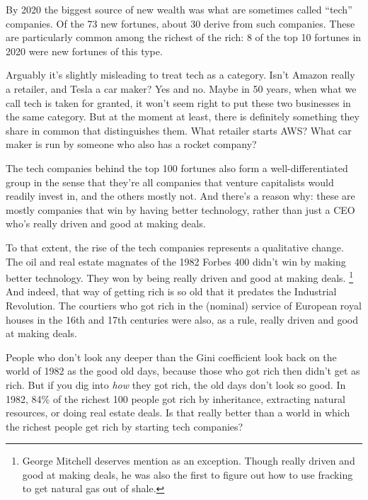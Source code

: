 By 2020 the biggest source of new wealth was what are sometimes called
``tech'' companies. Of the 73 new fortunes, about 30 derive from such
companies. These are particularly common among the richest of the rich:
8 of the top 10 fortunes in 2020 were new fortunes of this type.

Arguably it's slightly misleading to treat tech as a category. Isn't
Amazon really a retailer, and Tesla a car maker? Yes and no. Maybe in 50
years, when what we call tech is taken for granted, it won't seem right
to put these two businesses in the same category. But at the moment at
least, there is definitely something they share in common that
distinguishes them. What retailer starts AWS? What car maker is run by
someone who also has a rocket company?

The tech companies behind the top 100 fortunes also form a
well-differentiated group in the sense that they're all companies that
venture capitalists would readily invest in, and the others mostly not.
And there's a reason why: these are mostly companies that win by having
better technology, rather than just a CEO who's really driven and good
at making deals.

To that extent, the rise of the tech companies represents a qualitative
change. The oil and real estate magnates of the 1982 Forbes 400 didn't
win by making better technology. They won by being really driven and
good at making deals. \footnote{George Mitchell deserves mention as an exception. Though really
driven and good at making deals, he was also the first to figure out how
to use fracking to get natural gas out of shale.} And indeed, that way of
getting rich is so old that it predates the Industrial Revolution. The
courtiers who got rich in the (nominal) service of European royal houses
in the 16th and 17th centuries were also, as a rule, really driven and
good at making deals.

People who don't look any deeper than the Gini coefficient look back on
the world of 1982 as the good old days, because those who got rich then
didn't get as rich. But if you dig into \emph{how} they got rich, the
old days don't look so good. In 1982, 84\% of the richest 100 people got
rich by inheritance, extracting natural resources, or doing real estate
deals. Is that really better than a world in which the richest people
get rich by starting tech companies?

